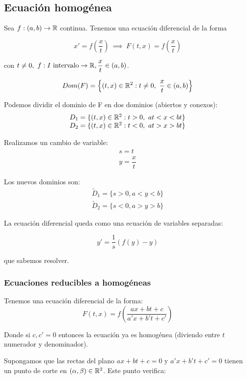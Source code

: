 \subsection{Ecuación homogénea}

Sea $f:(a,b) \to \mathbb{R}$ continua. Tenemos una ecuación diferencial de la forma

\[x' = f\left(\frac{x}{t}\right) \ \implies \ F\left(t,x\right) = f\left(\frac{x}{t}\right)\]

con $t \neq 0,\ f: I \text{ intervalo} \to \mathbb{R}, \dfrac{x}{t} \in (a,b)$.

\[Dom(F) = \left\{(t,x)\in \mathbb{R} ^2 : t \neq 0, \ \frac{x}{t} \in (a,b)\right\}\]

Podemos dividir el dominio de F en dos dominios (abiertos y conexos):\\
\[
\begin{array}{l}
  D_1 = \{(t,x) \in \mathbb{R} ^2 : t > 0, \ at < x < bt\}\\
  D_2 = \{(t,x) \in \mathbb{R} ^2 : t < 0, \ at > x > bt\}
\end{array}
\]

Realizamos un cambio de variable:
\[
\begin{array}{l}
  s = t\\
  y = \dfrac{x}{t}
\end{array}
\]

Los nuevos dominios son:
\[
\begin{array}{l}
  \widetilde{D}_1 = \{s > 0, a < y < b\}\\
  \widetilde{D}_2 = \{s < 0, a > y > b\}
\end{array}
\]

La ecuación diferencial queda como una ecuación de variables separadas:

$$y' = \frac{1}{s}\left(f(y) - y\right)$$

que sabemos resolver.

\subsubsection{Ecuaciones reducibles a homogéneas}

Tenemos una ecuación diferencial de la forma: 
\[
F(t,x) = f\left( \frac{ax+bt+c}{a'x+b't+c'} \right)
\]

Donde si $c,c' = 0$ entonces la ecuación ya es homogénea (diviendo entre $t$ numerador y denominador).

Supongamos que las rectas del plano $ax + bt+c=0$ y $a'x+b't+c'=0$ tienen un punto de corte en $(\alpha, \beta ) \in \mathbb{R}^2$. Este punto verifica:

